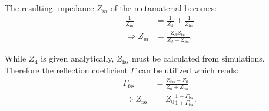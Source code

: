 The resulting impedance $Z_m$ of the metamaterial becomes:
\begin{align}
\nonumber
&&\frac{1}{Z_\mathrm{m}} &= \frac{1}{Z_\mathrm{d}} + \frac{1}{Z_\mathrm{fss}}\\
&&\Rightarrow Z_\mathrm{m} &= \frac{Z_\mathrm{d} Z_\mathrm{fss}}{Z_d + Z_\mathrm{fss}}.
\end{align}

While $Z_\mathrm{d}$ is given analytically, $Z_\mathrm{fss}$ must be calculated from simulations. Therefore the reflection coefficient
$\Gamma$ can be utilized which reads:
\begin{align}
\nonumber
&&\Gamma_\mathrm{fss} &= \frac{Z_\mathrm{fss}-Z_0}{Z_0 + Z_\mathrm{fss}}\\
&&\Rightarrow Z_\mathrm{fss} &= Z_0 \frac{1 - \Gamma_\mathrm{fss}}{1 + \Gamma_\mathrm{fss}}.
\end{align}